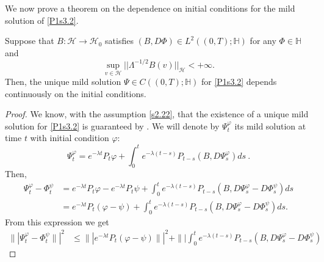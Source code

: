 \documentclass[review,onefignum,onetabnum]{siamart190516}
\begin{document}
 We now prove a theorem on the dependence on initial conditions for the mild
solution of \eqref{P1s3.2}.
    \begin{theorem}
        \label{Cont-Mild-Sol}
        Suppose that 
        $B:
            \mathcal{H}
            \rightarrow 
            \mathcal{H}_0
        $ satisfies 
        $(B,D\Phi)\in L^2((0,T);\mathbb{H})$ 
        for any $\Phi\in\mathbb{H}$ and
        \begin{equation}\label{s2.22}
            \sup_{v\in \mathcal{H}} 
            ||\Lambda^{-1/2}B(v)||_{\mathcal{H}}<+\infty.
        \end{equation}
        Then, the unique mild solution $\Psi\in C((0,T); \mathbb{H})$ for
        \eqref{P1s3.2} depends continuously on the initial conditions.
    \end{theorem}
    \begin{proof}
        We know, with the assumption \eqref{s2.22}, that the existence of a 
        unique mild solution for \eqref{P1s3.2} is guaranteed by
        . We will denote by $\Psi_t^\varphi$ its mild solution at 
        time $t$ with initial condition $\varphi$:
        \begin{equation*}
            \Psi_t^\varphi
            =   e^{-\lambda t} P_t  
            \varphi
            +  
            \int_0^t e^{-\lambda (t-s)} P_{t-s}
            (B,D\Psi_s^\varphi) ds \ .
        \end{equation*}
        Then,
        \begin{align*}
            \Psi_t^\varphi-\Phi_t^\psi
                &=  
                e^{-\lambda t} P_t \varphi -e^{-\lambda t} P_t
                \psi +
                \int_0^t 
                e^{-\lambda (t-s)}
                P_{t-s}(B,D\Psi_s^\varphi-D\Phi_s^\psi) ds
                \\
                &= 
                e^{-\lambda t} 
                P_t (\varphi - \psi) 
                + \int_0^t
                    e^{-\lambda(t-s)} P_{t-s} (B, D \Psi_s^\varphi - 
                    D\Phi_s^\psi) ds.
        \end{align*}
        From this expression we get
        \begin{align*}
            \|| 
                \Psi_t^\varphi - \Phi_t^\psi
            \||^2
            &\le 
            \| |
            e^{-\lambda t}
            P_t (\varphi - \psi)
            \||^2
            +
            \||
            \int_0^t 
                e^{-\lambda (t-s)}
                P_{t-s}
                (B,D\Psi_s^\varphi-D\Phi_s^\psi) 

\end{align*}
\end{proof}
\end{document}
